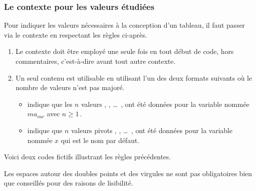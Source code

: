 \documentclass[10pt, a4paper]{article}
\begin{document}

\subsubsection{Le contexte  pour les valeurs étudiées}
\label{tns-math-functab-dsl-l3-ctxt-xvals}

Pour indiquer les valeurs nécessaires à la conception d'un tableau, il faut passer via le contexte  en respectant les règles ci-après.
%
\begin{enumerate}
    \item Le contexte  doit être employé une seule fois en tout début de code, hors commentaires, c'est-à-dire avant tout autre contexte.


    \item Un seul contenu est utilisable en utilisant l'un des deux formats suivants où le nombre de valeurs n'est pas majoré.
    \begin{itemize}
        \item {} indique que les $n$ valeurs  ,  , \dots\ ,  ont été données pour la variable nommée $ma_{var}$ avec $n \geq 1$\,.

        \item {} indique que $n$ valeurs pivots  ,  , \dots\ ,  ont été données pour la variable nommée $x$ qui est le nom par défaut.
    \end{itemize}
\end{enumerate}


\medskip


Voici deux codes fictifs illustrant les règles précédentes.
\begin{multicols}{2}

\end{multicols}




\begin{tdocnote}
    Les espaces autour des doubles points et des virgules ne sont pas obligatoires bien que conseillés pour des raisons de lisibilité.
\end{tdocnote}
\end{document}
